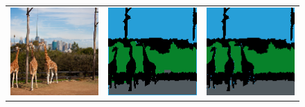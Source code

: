 \begin{figure}[t]
\begin{tabular}{c c c c c c c c c c c c}
\multicolumn{4}{c}{
\includegraphics[height=0.277\textwidth]{experiments2_files/509_img_254.png}} & 
\multicolumn{4}{c}{
\includegraphics[height=0.277\textwidth]{experiments2_files/509_reordered_preds_254.png}} & 
\multicolumn{4}{c}{
\includegraphics[height=0.277\textwidth]{experiments2_files/509_targets_254.png}} \\


\end{tabular}
\end{figure}
